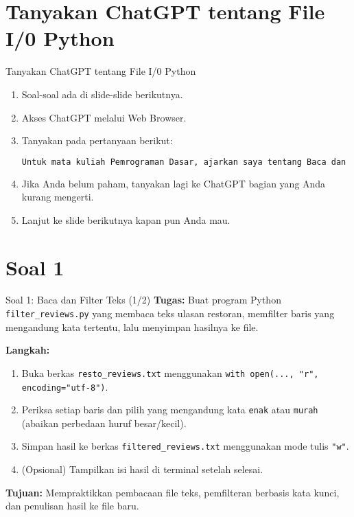 \documentclass[aspectratio=169, table]{beamer}
\begin{document}
\section{Tanyakan ChatGPT tentang File I/0 Python }
\begin{frame}[fragile]{Tanyakan ChatGPT tentang File I/0 Python}
\vspace{20pt}
\centering
\begin{enumerate}
\item Soal-soal ada di slide-slide berikutnya.
\item Akses ChatGPT melalui Web Browser.
\item Tanyakan pada pertanyaan berikut:
\begin{lstlisting}[language=bash]
Untuk mata kuliah Pemrograman Dasar, ajarkan saya tentang Baca dan tulis File di Python yang mencakup (1) membaca dan menulis file teks, (2) penyaringan dan penghitungan data, (3) membaca dan menulis file CSV, dan (2) agregasi dan ringkasan data.
\end{lstlisting}
\item Jika Anda belum paham, tanyakan lagi ke ChatGPT bagian yang Anda kurang mengerti.
\item Lanjut ke slide berikutnya kapan pun Anda mau.
\end{enumerate}
\end{frame}



\section{Soal 1}
\begin{frame}[fragile]{Soal 1: Baca dan Filter Teks (1/2)}
\vspace{15pt}
\textbf{Tugas:}  
Buat program Python \texttt{filter\_reviews.py} yang membaca teks ulasan restoran, memfilter baris yang mengandung kata tertentu, lalu menyimpan hasilnya ke file.

\textbf{Langkah:}
\begin{enumerate}
  \item Buka berkas \texttt{resto\_reviews.txt} menggunakan \texttt{with open(..., "r", encoding="utf-8")}.
  \item Periksa setiap baris dan pilih yang mengandung kata \texttt{enak} atau \texttt{murah}  
        (abaikan perbedaan huruf besar/kecil).
  \item Simpan hasil ke berkas \texttt{filtered\_reviews.txt}  
        menggunakan mode tulis \texttt{"w"}.
  \item (Opsional) Tampilkan isi hasil di terminal setelah selesai.
\end{enumerate}

\textbf{Tujuan:}  
Mempraktikkan pembacaan file teks, pemfilteran berbasis kata kunci, dan penulisan hasil ke file baru.
\end{frame}
\end{document}
